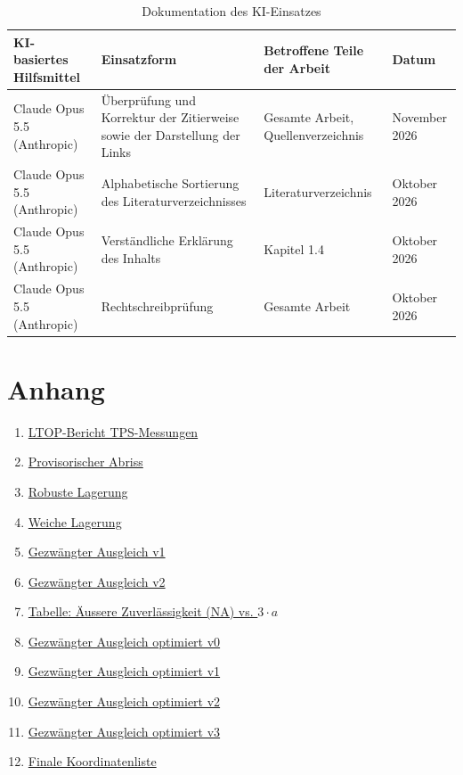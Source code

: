 \begin{table}[H]
\centering
\small
\begin{tabularx}{\textwidth}{>{\raggedright\arraybackslash}p{3.2cm} X >{\raggedright\arraybackslash}p{3.2cm} >{\raggedright\arraybackslash}p{2.4cm}}
\toprule
\textbf{KI-basiertes Hilfsmittel} & \textbf{Einsatzform} & \textbf{Betroffene Teile der Arbeit} & \textbf{Datum} \\
\midrule
Claude Opus 5.5 (Anthropic) & Überprüfung und Korrektur der Zitierweise sowie der Darstellung der Links & Gesamte Arbeit, Quellenverzeichnis & November 2026 \\
Claude Opus 5.5 (Anthropic) & Alphabetische Sortierung des Literaturverzeichnisses & Literaturverzeichnis & Oktober 2026 \\
Claude Opus 5.5 (Anthropic) & Verständliche Erklärung des Inhalts & Kapitel 1.4 & Oktober 2026 \\
Claude Opus 5.5 (Anthropic) & Rechtschreibprüfung & Gesamte Arbeit & Oktober 2026 \\
\bottomrule
\end{tabularx}
\caption{Dokumentation des KI-Einsatzes}
\end{table}

\section{Anhang}
\label{app:anhang}

\begin{enumerate}
  \item \hyperlink{pdf:ltop}{LTOP-Bericht TPS-Messungen}\label{nr:ltop}
  \item \hyperlink{pdf:abriss}{Provisorischer Abriss}\label{nr:abriss}
  \item \hyperlink{pdf:robust}{Robuste Lagerung}\label{nr:robust}
  \item \hyperlink{pdf:weich}{Weiche Lagerung}\label{nr:weich}
  \item \hyperlink{pdf:gezw1}{Gezwängter Ausgleich v1}\label{nr:gezw1}
  \item \hyperlink{pdf:gezw2}{Gezwängter Ausgleich v2}\label{nr:gezw2}
  \item \hyperlink{pdf:na3a}{Tabelle: Äussere Zuverlässigkeit (NA) vs. $3\cdot a$}\label{nr:na3a}
  \item \hyperlink{pdf:opt0}{Gezwängter Ausgleich optimiert v0}\label{nr:opt0}
  \item \hyperlink{pdf:opt1}{Gezwängter Ausgleich optimiert v1}\label{nr:opt1}
  \item \hyperlink{pdf:opt2}{Gezwängter Ausgleich optimiert v2}\label{nr:opt2}
  \item \hyperlink{pdf:opt3}{Gezwängter Ausgleich optimiert v3}\label{nr:opt3}
  \item \hyperlink{pdf:koordinaten}{Finale Koordinatenliste}\label{nr:koordinaten}
\end{enumerate}

